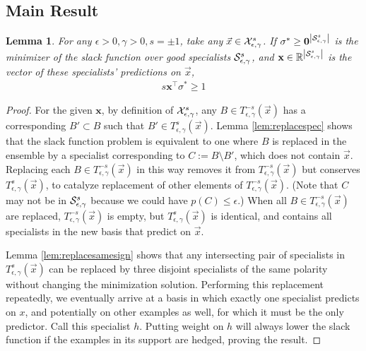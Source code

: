 \documentclass{article}
\newtheorem{lemma}[theorem]{Lemma}
\newcommand{\x}{\vec{x}}
\newcommand{\RR}{\mathbb{R}}      %
\newcommand{\abs}[1]{\left| #1 \right|}
\newcommand{\vx}{\mathbf{x}}
\newcommand{\vzero}{\mathbf{0}}
\newcommand{\comment}[3]{\marginpar{\textcolor{#2}{#1: #3}}}
\newcommand{\akshay}[1]{\comment{Akshay}{magenta}{#1}}
\begin{document}
\subsection{Main Result}

\begin{lemma}
For any $\epsilon > 0, \gamma > 0, s = \pm 1$, take any $\x \in \XepsGamSig$. 
If $\sigma^* \geq \vzero^{\abs{\SepsGam^{s}}}$ is the minimizer of the slack function over good specialists ${\cal S}_{\epsilon,\gamma}^{s}$, 
and $\vx \in \RR^{\abs{\SepsGam^{s}}}$ is the vector of these specialists' predictions on $\x$, 
\begin{align}
s \vx^\top \sigma^* \geq 1
\end{align}
\end{lemma}
\begin{proof}
For the given $\vx$, by definition of ${\cal X}_{\epsilon,\gamma}^{s}$, 
any $B \in T_{\epsilon, \gamma}^{-s} (\x)$ has a corresponding $B' \subset B$ such that $B' \in T_{\epsilon, \gamma}^{s} (\x)$. 
Lemma \ref{lem:replacespec} shows that the slack function problem is equivalent to one where $B$ is replaced in the ensemble by a specialist corresponding to $C := B \setminus B'$, 
which does not contain $\x$. 
Replacing each $B \in T_{\epsilon, \gamma}^{-s} (\x)$ in this way removes it from $T_{\epsilon, \gamma}^{-s} (\x)$ but conserves $T_{\epsilon, \gamma}^{s} (\x)$, 
to catalyze replacement of other elements of $T_{\epsilon, \gamma}^{-s} (\x)$. 
(Note that $C$ may not be in ${\cal S}_{\epsilon,\gamma}^{s}$ because we could have $p(C) \leq \epsilon$.)
When all $B \in T_{\epsilon, \gamma}^{-s} (\x)$ are replaced, $T_{\epsilon, \gamma}^{-s} (\x)$ is empty, 
but $T_{\epsilon, \gamma}^{s} (\x)$ is identical, 
and contains all specialists in the new basis that predict on $\x$. 

Lemma \ref{lem:replacesamesign} shows that any intersecting pair of specialists in $T_{\epsilon, \gamma}^{s} (\x)$ can be replaced by three disjoint specialists of the same polarity without changing the minimization solution. 
Performing this replacement repeatedly, we eventually arrive at a basis in which exactly one specialist predicts on $x$, and potentially on other examples as well, for which it must be the only predictor. Call this specialist $h$.
Putting weight on $h$ will always lower the slack function if the examples in its support are hedged, proving the result.
\end{proof}

\akshay{Not sure about this because $h$ may have bias $< 0$ even though its parent specialists do not. }
\end{document}
